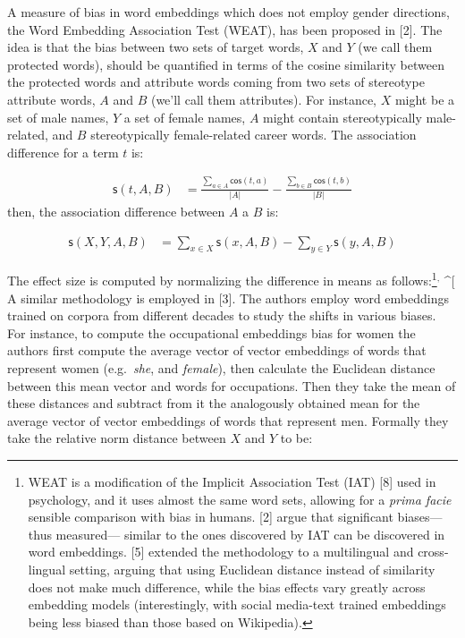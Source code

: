 \documentclass[
  10pt,
  dvipsnames,enabledeprecatedfontcommands, twocolumn]{scrartcl}
\begin{document}
A measure of bias in word embeddings which does not employ gender
directions, the Word Embedding Association Test (WEAT), has been
proposed in {[}2{]}. The idea is that the bias between two sets of
target words, \(X\) and \(Y\) (we call them protected words), should be
quantified in terms of the cosine similarity between the protected words
and attribute words coming from two sets of stereotype attribute words,
\(A\) and \(B\) (we'll call them attributes). For instance, \(X\) might
be a set of male names, \(Y\) a set of female names, \(A\) might contain
stereotypically male-related, and \(B\) stereotypically female-related
career words. The association difference for a term \(t\) is:

\vspace{-2mm}

\footnotesize

\begin{align}
\mathsf{s}(t,A,B) & = \frac{\sum_{a\in A}\mathsf{cos}(t,a)}{\vert A\vert} - \frac{\sum_{b\in B}\mathsf{cos}(t,b)}{\vert B\vert}
\end{align} \normalsize \noindent then, the association difference
between \(A\) a \(B\) is:

\vspace{-2mm}

\footnotesize

\begin{align}
\mathsf{s}(X,Y,A,B) & = \sum_{x\in X} \mathsf{s}(x,A,B) -  \sum_{y\in Y} \mathsf{s}(y,A,B)
\end{align} \normalsize

The effect size is computed by normalizing the difference in means as
follows:\footnote{ WEAT is a modification of the Implicit Association
  Test (IAT) {[}8{]} used in psychology, and it uses almost the same
  word sets, allowing for a \emph{prima facie} sensible comparison with
  bias in humans. {[}2{]} argue that significant biases---thus
  measured--- similar to the ones discovered by IAT can be discovered in
  word embeddings. {[}5{]} extended the methodology to a multilingual
  and cross-lingual setting, arguing that using Euclidean distance
  instead of similarity does not make much difference, while the bias
  effects vary greatly across embedding models (interestingly, with
  social media-text trained embeddings being less biased than those
  based on Wikipedia).}\(^{, }\) \^{}{[} A similar methodology is
employed in {[}3{]}. The authors employ word embeddings trained on
corpora from different decades to study the shifts in various biases.
For instance, to compute the occupational embeddings bias for women the
authors first compute the average vector of vector embeddings of words
that represent women (e.g.~\emph{she}, and \emph{female}), then
calculate the Euclidean distance between this mean vector and words for
occupations. Then they take the mean of these distances and subtract
from it the analogously obtained mean for the average vector of vector
embeddings of words that represent men. Formally they take the relative
norm distance between \(X\) and \(Y\) to be:
\end{document}
